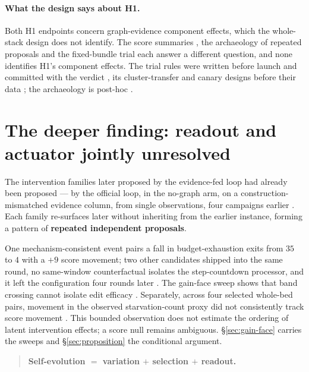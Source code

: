 \paragraph{What the design says about H1.} Both H1 endpoints concern
graph-evidence component effects, which the whole-stack design does not
identify. The score summaries , the archaeology of repeated
proposals  and the fixed-bundle trial  each answer a different
question, and none identifies H1's component effects. The trial rules were
written before launch and committed with the verdict , its
cluster-transfer and canary designs before their data ; the
archaeology is post-hoc .

\section{The deeper finding: readout and actuator jointly unresolved}
\label{sec:readout}

The intervention families later proposed by the evidence-fed loop had already been
proposed --- by the official loop, in the no-graph arm, on
a construction-mismatched evidence column, from single observations, four
campaigns earlier . Each family re-surfaces later without
inheriting from the earlier instance, forming a pattern of \textbf{repeated
independent proposals}.

One mechanism-consistent event pairs a fall in budget-exhaustion exits from
$35$ to $4$ with a $+9$ score movement; two other candidates shipped into the
same round, no same-window counterfactual isolates the step-countdown
processor, and it left the configuration four rounds later .
The gain-face sweep shows that band crossing cannot isolate edit efficacy
. Separately, across four selected whole-bed pairs, movement in the
observed starvation-count proxy did not consistently track score movement
. This bounded
observation does not estimate the ordering of latent intervention effects;
a score null remains ambiguous. \S\ref{sec:gain-face} carries the sweeps and
\S\ref{sec:proposition} the conditional argument.

\begin{quote}
\textbf{Self-evolution $=$ variation $+$ selection $+$ readout.}
\end{quote}

